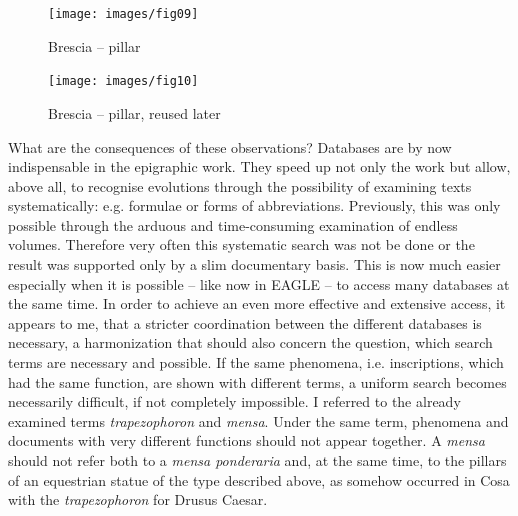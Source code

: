 \documentclass[amsthm,ebook]{saparticle}
\begin{document}
\begin{figure}[!bp]
\centering
 \texttt{[image: images/fig09]}
\caption{Brescia -- pillar}
\label{fig:9}
\end{figure}

\begin{figure}[!bp]
\centering
 \texttt{[image: images/fig10]}
\caption{Brescia -- pillar, reused later}
\label{fig:10}
\end{figure}

What are the consequences of these observations? Databases are by now indispensable 
in the epigraphic work. They speed up not only the work but allow, above all, to 
recognise evolutions through the possibility of examining texts systematically: 
e.g. formulae or forms of abbreviations. Previously, this was only possible through 
the arduous and time-consuming examination of endless volumes. Therefore very often 
this systematic search was not be done or the result was supported only by a slim 
documentary basis. This is now much easier especially when it is possible – like 
now in EAGLE – to access many databases at the same time. In order to achieve 
an even more effective and extensive access, it appears to me, that a stricter 
coordination between the different databases is necessary, a harmonization that 
should also concern the question, which search terms are necessary and possible. 
If the same phenomena, i.e. inscriptions, which had the same function, are shown 
with different terms, a uniform search becomes necessarily difficult, if not completely 
impossible. I referred to the already examined terms \textit{trapezophoron} and 
\textit{mensa}. Under the same term, phenomena and documents with very different 
functions should not appear together. A \textit{mensa }should not refer both to 
a \textit{mensa ponderaria} and, at the same time, to the pillars of an equestrian 
statue of the type described above, as somehow occurred in Cosa with the \textit{trapezophoron 
}for Drusus Caesar. 
\end{document}
